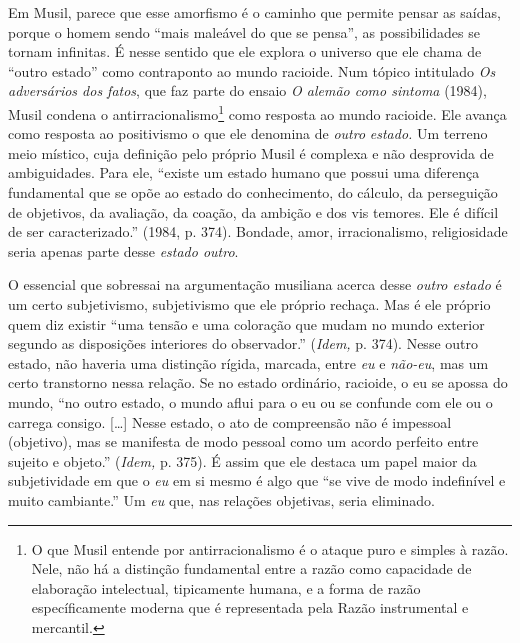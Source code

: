 Em Musil, parece que esse amorfismo é o caminho que permite pensar as
saídas, porque o homem sendo ``mais maleável do que se pensa'', as
possibilidades se tornam infinitas. É nesse sentido que ele explora o
universo que ele chama de ``outro estado'' como contraponto ao mundo
racioide. Num tópico intitulado \emph{Os adversários dos fatos}, que faz
parte do ensaio \emph{O alemão como sintoma} (1984), Musil condena o
antirracionalismo\footnote{O que Musil entende por antirracionalismo é o
  ataque puro e simples à razão. Nele, não há a distinção fundamental
  entre a razão como capacidade de elaboração intelectual, tipicamente
  humana, e a forma de razão específicamente moderna que é representada
  pela Razão instrumental e mercantil.} como resposta ao mundo racioide.
Ele avança como resposta ao positivismo o que ele denomina de
\emph{outro} \emph{estado.} Um terreno meio místico, cuja definição pelo
próprio Musil é complexa e não desprovida de ambiguidades. Para ele,
``existe um estado humano que possui uma diferença fundamental que se
opõe ao estado do conhecimento, do cálculo, da perseguição de objetivos,
da avaliação, da coação, da ambição e dos vis temores. Ele é difícil de
ser caracterizado.'' (1984, p. 374). Bondade, amor, irracionalismo,
religiosidade seria apenas parte desse \emph{estado outro}.

O essencial que sobressai na argumentação musiliana acerca desse
\emph{outro estado} é um certo subjetivismo, subjetivismo que ele
próprio rechaça. Mas é ele próprio quem diz existir ``uma tensão e uma
coloração que mudam no mundo exterior segundo as disposições interiores
do observador.'' (\emph{Idem,} p. 374). Nesse outro estado, não haveria
uma distinção rígida, marcada, entre \emph{eu} e \emph{não-eu}, mas um
certo transtorno nessa relação. Se no estado ordinário, racioide, o eu
se apossa do mundo, ``no outro estado, o mundo aflui para o eu ou se
confunde com ele ou o carrega consigo. {[}\ldots{}{]} Nesse estado, o
ato de compreensão não é impessoal (objetivo), mas se manifesta de modo
pessoal como um acordo perfeito entre sujeito e objeto.'' (\emph{Idem,}
p. 375). É assim que ele destaca um papel maior da subjetividade em que
o \emph{eu} em si mesmo é algo que ``se vive de modo indefinível e muito
cambiante.'' Um \emph{eu} que, nas relações objetivas, seria eliminado.

